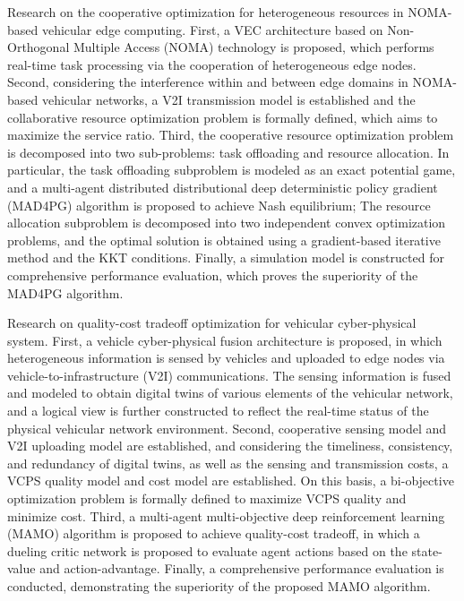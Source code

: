 \begin{eabstract}
 Research on the cooperative optimization for heterogeneous resources in NOMA-based vehicular edge computing.
First, a VEC architecture based on Non-Orthogonal Multiple Access (NOMA) technology is proposed, which performs real-time task processing via the cooperation of heterogeneous edge nodes. 
Second, considering the interference within and between edge domains in NOMA-based vehicular networks, a V2I transmission model is established and the collaborative resource optimization problem is formally defined, which aims to maximize the service ratio. 
Third, the cooperative resource optimization problem is decomposed into two sub-problems: task offloading and resource allocation. 
In particular, the task offloading subproblem is modeled as an exact potential game, and a multi-agent distributed distributional deep deterministic policy gradient (MAD4PG) algorithm is proposed to achieve Nash equilibrium; The resource allocation subproblem is decomposed into two independent convex optimization problems, and the optimal solution is obtained using a gradient-based iterative method and the KKT conditions. 
Finally, a simulation model is constructed for comprehensive performance evaluation, which proves the superiority of the MAD4PG algorithm.


 Research on quality-cost tradeoff optimization for vehicular cyber-physical system.
First, a vehicle cyber-physical fusion architecture is proposed, in which heterogeneous information is sensed by vehicles and uploaded to edge nodes via vehicle-to-infrastructure (V2I) communications. 
The sensing information is fused and modeled to obtain digital twins of various elements of the vehicular network, and a logical view is further constructed to reflect the real-time status of the physical vehicular network environment.
Second, cooperative sensing model and V2I uploading model are established, and considering the timeliness, consistency, and redundancy of digital twins, as well as the sensing and transmission costs, a VCPS quality model and cost model are established. 
On this basis, a bi-objective optimization problem is formally defined to maximize VCPS quality and minimize cost.
Third, a multi-agent multi-objective deep reinforcement learning (MAMO) algorithm is proposed to achieve quality-cost tradeoff, in which a dueling critic network is proposed to evaluate agent actions based on the state-value and action-advantage.
Finally, a comprehensive performance evaluation is conducted, demonstrating the superiority of the proposed MAMO algorithm.


\end{eabstract}
